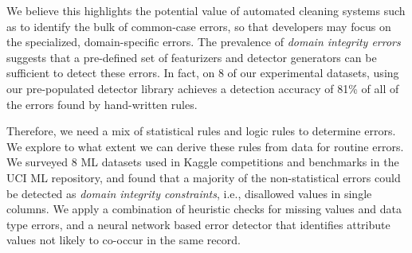  We believe this highlights the potential value of automated cleaning systems such as \sys to identify the bulk of common-case errors, so that developers may focus on the specialized, domain-specific errors.  The prevalence of {\it domain integrity errors} suggests that a pre-defined set of featurizers and detector generators can be sufficient to detect these errors.  In fact, on 8 of our experimental datasets, \sys using our pre-populated detector library achieves a detection accuracy of 81\% of all of the errors found by hand-written rules.

Therefore, we need a mix of statistical rules and logic rules to determine errors.
We explore to what extent we can derive these rules from data for routine errors. 
We surveyed 8 ML datasets used in Kaggle competitions and benchmarks in the UCI ML repository, and found that a majority of the non-statistical errors could be detected as \emph{domain integrity constraints}, i.e., disallowed values in single columns.
We apply a combination of heuristic checks for missing values and data type errors, and a neural network based error detector that identifies attribute values not likely to co-occur in the same record.

